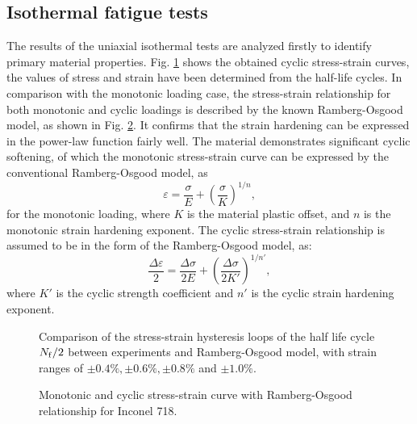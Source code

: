\documentclass[preprint,5p,twocolumn,11pt,sort&compress]{elsarticle}
\begin{document}
\subsection{Isothermal fatigue tests}
The results of the uniaxial isothermal tests are analyzed firstly to identify primary material properties. Fig. \ref{Fig:plot_exp_half_life_cycle} shows the obtained cyclic stress-strain curves, the values of stress and strain have been determined from the half-life cycles. In comparison with the monotonic loading case, the stress-strain relationship for both monotonic and cyclic loadings is described by the known Ramberg-Osgood model, as shown in Fig. \ref{Fig:plot_monotonic_cyclic_osgood}. It confirms that the strain hardening can be expressed in the power-law function fairly well. The material demonstrates significant cyclic softening, of which the monotonic stress-strain curve can be expressed by the conventional Ramberg-Osgood model, as
\begin{equation}
{\varepsilon } = \frac{{\sigma }}{{E}} + {\left( {\frac{{\sigma }}{{K}}} \right)^{1/n}},
\end{equation}
for the monotonic loading, where $K$ is the material plastic offset, and $n$ is the monotonic strain hardening exponent.
The cyclic stress-strain relationship is assumed to be in the form of the Ramberg-Osgood model, as:
\begin{equation}
\frac{{\Delta \varepsilon }}{2} = \frac{{\Delta \sigma }}{{2E}} + {\left( {\frac{{\Delta \sigma }}{{2K'}}} \right)^{1/n'}},
\end{equation}
where $K'$ is the cyclic strength coefficient and $n'$ is the cyclic strain hardening exponent.

\begin{figure}[!htp]
\caption{Comparison of the stress-strain hysteresis loops of the half life cycle $N_{\rm f}/2$ between experiments and Ramberg-Osgood model, with strain ranges of $\pm0.4\%, \pm0.6\%, \pm0.8\%$ and $\pm1.0\%$.}
\label{Fig:plot_exp_half_life_cycle}
\end{figure}

\begin{figure}[!htp]
\caption{Monotonic and cyclic stress-strain curve with Ramberg-Osgood relationship for Inconel 718.}
\label{Fig:plot_monotonic_cyclic_osgood}
\end{figure}
\end{document}
